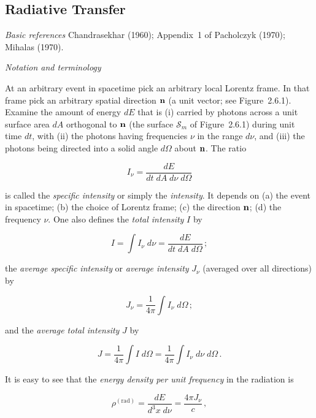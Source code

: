 \subsection{Radiative Transfer}
\label{sec:2.6}

\textit{Basic references}\quad
Chandrasekhar (1960); Appendix~1 of Pacholczyk (1970); Mihalas (1970).

\bigskip
\textit{Notation and terminology}

At an arbitrary event in spacetime pick an arbitrary
local Lorentz frame.  In that frame pick an arbitrary spatial direction $\mathbf{n}$ (a
unit vector; see Figure~2.6.1).  Examine the amount of energy $dE$ that is (i) carried
by photons across a unit surface area $dA$ orthogonal to $\mathbf{n}$ (the surface $\mathscr{S}_m$ of
Figure~2.6.1) during unit time $dt$, with (ii) the photons having frequencies $\nu$ in
the range $d\nu$, and (iii) the photons being directed into a solid angle $d\Omega$ about
$\mathbf{n}$.  The ratio

\begin{equation}
I_\nu = \frac{dE}{dt\;dA\;d\nu\;d\Omega}
\tag{2.6.1}
\end{equation}

is called the \textit{specific intensity} or simply the \textit{intensity}.  It depends on (a) the
event in spacetime; (b) the choice of Lorentz frame; (c) the direction $\mathbf{n}$; (d)
the frequency $\nu$.  One also defines the \textit{total intensity} $I$ by

\begin{equation}
I = \int I_\nu\;d\nu = \frac{dE}{dt\;dA\;d\Omega}\,;
\tag{2.6.2}
\end{equation}

the \textit{average specific intensity} or \textit{average intensity} $J_\nu$ (averaged over all directions)
by

\begin{equation}
J_\nu = \frac{1}{4\pi}\int I_\nu\;d\Omega\,;
\tag{2.6.3}
\end{equation}

and the \textit{average total intensity} $J$ by

\begin{equation}
J = \frac{1}{4\pi}\int I\;d\Omega = \frac{1}{4\pi}\int I_\nu\;d\nu\;d\Omega\,.
\tag{2.6.4}
\end{equation}

It is easy to see that the \textit{energy density per unit frequency} in the radiation is

\begin{equation}
\rho^{(\text{rad})} = \frac{dE}{d^3x\;d\nu} = \frac{4\pi J_\nu}{c}\,,
\tag{2.6.5}
\end{equation}

